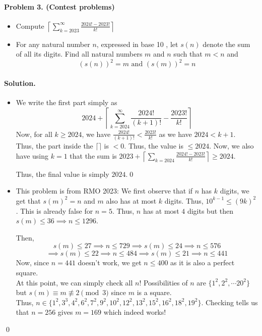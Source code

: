 \documentclass[12pt]{article}
\newenvironment{solution}
{\paragraph{Solution.}}
{\qed\eject}
\begin{document}
\paragraph*{\textbf{Problem 3.} (Contest problems)} 
\begin{itemize}
    \item Compute $\left\lceil\displaystyle\sum_{k=2023}^{\infty}\frac{2024!-2023!}{k!}\right\rceil$
    \item For any natural number $n$, expressed in base 10 , let $s(n)$ denote the sum of all its digits. Find all natural numbers $m$ and $n$ such that $m<n$ and
    \[(s(n))^2=m \text { and }(s(m))^2=n\]
\end{itemize} 

\begin{solution}
    \begin{itemize}
        \item We write the first part simply as \[2024+\left\lceil{}\sum_{k=2024}^{\infty}\frac{2024!}{(k+1)!}-\frac{2023!}{k!}\right\rceil{}\] Now, for all $k\ge 2024$, we have $\frac{2024!}{(k+1)!}<\frac{2023!}{k!}$ as we have $2024<k+1$.\\
        Thus, the part inside the $\lceil \rceil$ is $<0$. Thus, the value is $\le 2024$. Now, we also have using $k=1$ that the sum is $2023+\left\lceil\displaystyle\sum_{k=2024}\frac{2024!-2023!}{k!}\right\rceil\ge 2024$.

        Thus, the final value is simply $2024$.\qed
        \item This problem is from RMO 2023:
            We first observe that if $n$ has $k$ digits, we get that $s(m)^2=n$ and $m$ also has at most $k$ digits. Thus, $10^{k-1}\le (9k)^2$. This is already false for $n=5$. Thus, $n$ has at most $4$ digits but then $s(m)\le 36\implies n\le 1296$.
            
            Then, \[s(m)\le 27\implies n\le 729\implies s(m)\le 24\implies n\le 576\]\[\implies s(m)\le 22\implies n\le 484\implies s(m)\le 21\implies n\le 441\]
            Now, since $n=441$ doesn't work, we get $n\le 400$ as it is also a perfect square.\\

            At this point, we can simply check all $n$! Possibilities of $n$ are $\{1^2, 2^2,\cdots 20^2\}$ but $s(m)\equiv m\not\equiv 2\pmod{3}$ since $m$ is a square.\\
            
            Thus, $n\in \{1^2, 3^3, 4^2, 6^2, 7^2, 9^2, 10^2, 12^2, 13^2, 15^2, 16^2, 18^2, 19^2\}$. Checking tells us that $n=256$ gives $m=169$ which indeed works!
    \end{itemize}
\end{solution}
\end{document}
